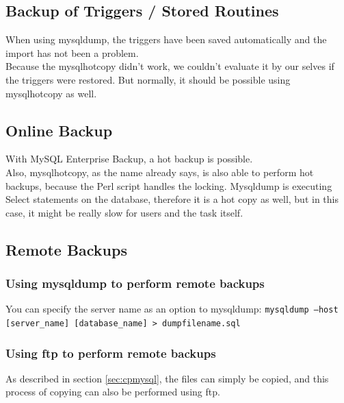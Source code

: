 \documentclass[10pt]{article}
\begin{document}
\subsection{Backup of Triggers / Stored Routines}
When using mysqldump, the triggers have been saved automatically and the import has not been a problem. \\
Because the mysqlhotcopy didn't work, we couldn't evaluate it by our selves if the triggers were restored. But normally, it should be possible using mysqlhotcopy as well.

\subsection{Online Backup}
With MySQL Enterprise Backup, a hot backup is possible. \\
Also, mysqlhotcopy, as the name already says, is also able to perform hot backups, because the Perl script handles the locking.
Mysqldump is executing Select statements on the database, therefore it is a hot copy as well, but in this case, it might be really slow for users and the task itself.
\subsection{Remote Backups}
\subsubsection{Using mysqldump to perform remote backups}
You can specify the server name as an option to mysqldump: 
\texttt{mysqldump --host [server\_name] [database\_name] \textgreater ~dumpfilename.sql}
\subsubsection{Using ftp to perform remote backups}
As described in section \ref{sec:cpmysql}, the files can simply be copied, and this process of copying can also be performed using ftp.
\end{document}
